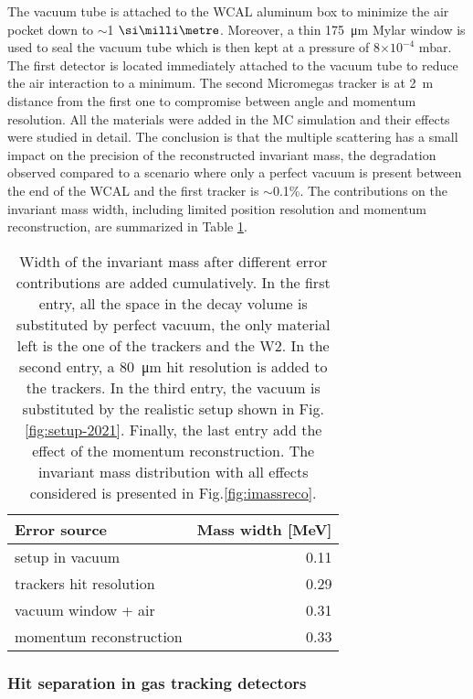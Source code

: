 The vacuum tube is attached to the WCAL aluminum box to minimize the air pocket down to $\sim$1 $\mmi$. Moreover, a thin \SI{175}{\micro\meter} Mylar window is used to seal the vacuum tube which is then kept at a pressure of 8$\times 10^{-4}$ \si{\milli\bar}. The first detector is located immediately attached to the vacuum tube to reduce the air interaction to a minimum. The second Micromegas tracker is at \SI{2}{\meter} distance from the first one to compromise between angle and momentum resolution. All the materials were added in the MC simulation and their effects were studied in detail. The conclusion is that the multiple scattering has a small impact on the precision of the reconstructed invariant mass, the degradation observed compared to a scenario where only a perfect vacuum is present between the end of the WCAL and the first tracker is $\sim$0.1\%. The contributions on the invariant mass width, including limited position resolution and momentum reconstruction, are summarized in Table \ref{tab:imass-width}.

\begin{center}
  \begin{table}[bth!]
    \centering
    \begin{tabular}{|l|r|}
      \hline
      Error source & Mass width [MeV]\\
      \hline
      setup in vacuum & 0.11\\
      trackers hit resolution & 0.29\\
      vacuum window + air & 0.31\\
      momentum reconstruction & 0.33\\
      \hline
    \end{tabular}
    \caption[Error budget for the invariant mass in 2021 setup]{Width of the invariant mass after different error contributions are added cumulatively. In the first entry, all the space in the decay volume is substituted by perfect vacuum, the only material left is the one of the trackers and the W2. In the second entry, a \SI{80}{\micro\meter} hit resolution is added to the trackers. In the third entry, the vacuum is substituted by the realistic setup shown in Fig.\ref{fig:setup-2021}. Finally, the last entry add the effect of the momentum reconstruction. The invariant mass distribution with all effects considered is presented in Fig.\ref{fig:imassreco}.}
    \label{tab:imass-width}    
  \end{table}
\end{center}

\subsubsection{Hit separation in gas tracking detectors}
\label{ch5:sec:separ-hit-micr}

